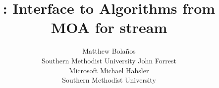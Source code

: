 \documentclass[nojss]{jss}
\author{
Matthew Bola\~nos\\Southern Methodist University
\And 
John Forrest\\Microsoft
\AND 
Michael Hahsler\\Southern Methodist University}
\title{\pkg{streamMOA}: Interface to Algorithms from MOA for stream}
\begin{document}
\vfill
\end{document}
